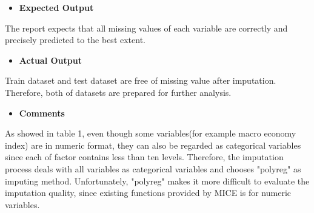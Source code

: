          \begin{itemize}
         	\item \textbf{Expected Output}
         \end{itemize}
         The report expects that all missing values of each variable are correctly and precisely predicted to the best extent. \\
         \begin{itemize}
         	\item \textbf{Actual Output}
         \end{itemize}
          Train dataset and test dataset are free of missing value after imputation. Therefore, both of datasets are prepared for further analysis. \\
         \begin{itemize}
         	\item \textbf{Comments}
         \end{itemize}
     \noindent As showed in table 1, even though some variables(for example macro economy index) are in numeric format, they can also be regarded as categorical variables since each of factor contains less than ten levels. Therefore, the imputation process deals with all variables as categorical variables and chooses "polyreg" as imputing method. Unfortunately, "polyreg" makes it more difficult to evaluate the imputation quality, since existing functions provided by MICE is for numeric variables.\\
